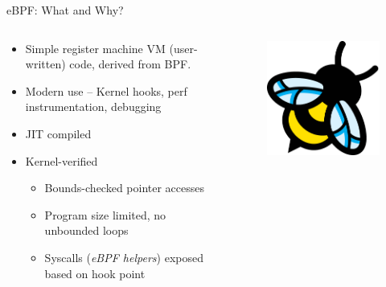 \documentclass[aspectratio=169,xcolor={dvipsnames}
,handout
]{beamer}
\begin{document}

\begin{frame}{eBPF: What and Why?}
	\begin{columns}
		\begin{column}{0.6\linewidth}
			\begin{itemize}
				\item Simple register machine VM (user-written) code, derived from BPF.
				\item Modern use -- Kernel hooks, perf instrumentation, debugging
				\item JIT compiled
				\item Kernel-verified
				\begin{itemize}
					\item Bounds-checked pointer accesses
					\item Program size limited, no unbounded loops
					\item Syscalls (\emph{eBPF helpers}) exposed based on hook point
				\end{itemize}
			\end{itemize}
		\end{column}
		\begin{column}{0.4\linewidth}
			\begin{figure}
				\centering
				\includegraphics[width=0.9\linewidth,keepaspectratio]{images/ebpf}
			\end{figure}
		\end{column}
	\end{columns}
\end{frame}
\end{document}
